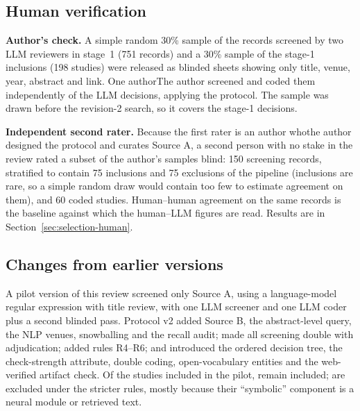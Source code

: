 \subsection{Human verification}
\label{sec:method-human}
\textbf{Author's check.} A simple random 30\% sample of the records screened by two LLM reviewers in stage~1 (751 records) and a 30\% sample of the stage-1 inclusions (198 studies) were released as blinded sheets showing only title, venue, year, abstract and link. \ifanonymous One author\else The author\fi{} screened and coded them independently of the LLM decisions, applying the protocol. The sample was drawn before the revision-2 search, so it covers the stage-1 decisions.

\textbf{Independent second rater.} Because \ifanonymous the first rater is an author who\else the author\fi{} designed the protocol and curates Source A, a second person with no stake in the review rated a subset of the author's samples blind: 150 screening records, stratified to contain 75 inclusions and 75 exclusions of the pipeline (inclusions are rare, so a simple random draw would contain too few to estimate agreement on them), and 60 coded studies. Human--human agreement on the same records is the baseline against which the human--LLM figures are read.
\ifhumancheck
Results are in Section~\ref{sec:selection-human}.
\else

\fi

\subsection{Changes from earlier versions}
\label{sec:method-changes}
A pilot version of this review screened only Source A, using a language-model regular expression with title review, with one LLM screener and one LLM coder plus a second blinded pass. Protocol v2 added Source B, the abstract-level query, the NLP venues, snowballing and the recall audit; made all screening double with adjudication; added rules R4--R6; and introduced the ordered decision tree, the check-strength attribute, double coding, open-vocabulary entities and the web-verified artifact check. Of the  studies included in the pilot,  remain included;  are excluded under the stricter rules, mostly because their ``symbolic'' component is a neural module or retrieved text.

